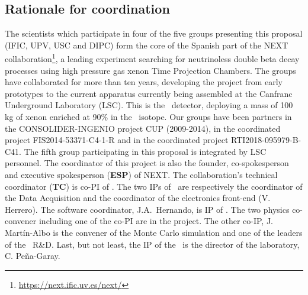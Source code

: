 \subsection{Rationale for coordination}
 The scientists which participate in four of the five groups presenting this proposal (IFIC, UPV, USC and DIPC) form the core of the Spanish part of the NEXT collaboration\footnote{\url{https://next.ific.uv.es/next/}}, a leading experiment searching for neutrinoless double beta decay processes using high pressure gas xenon Time Projection Chambers. The groups have collaborated for more than ten years, developing the project from early prototypes to the current apparatus currently being assembled at the Canfranc Underground Laboratory (LSC). This is the \Next\ detector, deploying a mass of 100 kg of xenon enriched at 90\% in the \XE\ isotope. Our groups have been partners in the CONSOLIDER-INGENIO project CUP (2009-2014), in the coordinated project FIS2014-53371-C4-1-R and in the coordinated project RTI2018-095979-B-C41. The fifth group participating in this proposal is integrated by LSC personnel. The coordinator of this project is also the founder, co-spokesperson and executive spokesperson ({\bf ESP}) of NEXT.  The collaboration's technical coordinator ({\bf TC}) is co-PI of \sDIPC. The two IPs of \sUPV\ are respectively the coordinator of the Data Acquisition  and the coordinator of the electronics front-end (V. Herrero). The software coordinator, J.A.~Hernando, is IP of \sUSC.  The two physics co-convener including one of the co-PI are in the \sIFIC project. The other co-IP, J. Martín-Albo is the convener of the Monte Carlo simulation and one of the leaders of the \NHD\ R\&D. Last, but not least, the IP of the \sLSC\ is the director of the laboratory, C. Pe\~na-Garay.  

  
% 
 
